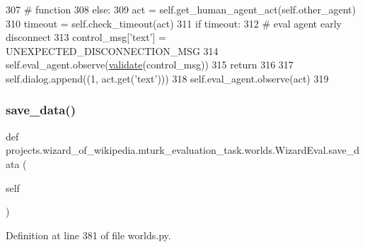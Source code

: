 \begin{DoxyCode}
307                 \textcolor{comment}{# function}
308             \textcolor{keywordflow}{else}:
309                 act = self.get\_human\_agent\_act(self.other\_agent)
310                 timeout = self.check\_timeout(act)
311                 \textcolor{keywordflow}{if} timeout:
312                     \textcolor{comment}{# eval agent early disconnect}
313                     control\_msg[\textcolor{stringliteral}{'text'}] = UNEXPECTED\_DISCONNECTION\_MSG
314                     self.eval\_agent.observe(\hyperlink{namespaceparlai_1_1core_1_1worlds_afc3fad603b7bce41dbdc9cdc04a9c794}{validate}(control\_msg))
315                     \textcolor{keywordflow}{return}
316 
317             self.dialog.append((1, act.get(\textcolor{stringliteral}{'text'})))
318             self.eval\_agent.observe(act)
319 
\end{DoxyCode}
\mbox{\label{classprojects_1_1wizard__of__wikipedia_1_1mturk__evaluation__task_1_1worlds_1_1WizardEval_af2db699f6af0f8b441fbf280c5b12302}} 
\subsubsection{\texorpdfstring{save\+\_\+data()}{save\_data()}}
{\footnotesize\ttfamily def projects.\+wizard\+\_\+of\+\_\+wikipedia.\+mturk\+\_\+evaluation\+\_\+task.\+worlds.\+Wizard\+Eval.\+save\+\_\+data (\begin{DoxyParamCaption}\item[{}]{self }\end{DoxyParamCaption})}



Definition at line 381 of file worlds.\+py.


